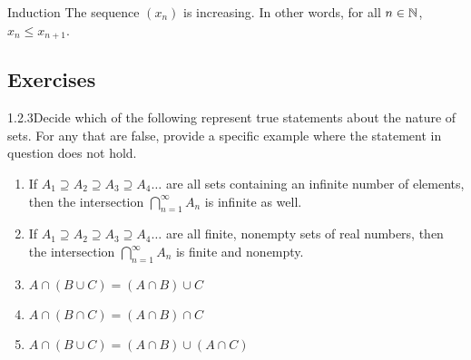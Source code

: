 \begin{example}
    {Induction} The sequence $(x_n)$ is increasing. In other words, for all $n\in \mathbb{N}$, $x_n \leq x_{n+1}$. 
\end{example}


\subsection*{Exercises}

\begin{exercise}
    {1.2.3}Decide which of the following represent true statements about
the nature of sets. For any that are false, provide a specific example where the
statement in question does not hold.
\begin{enumerate}
    \item If $A_1 \supseteq A_2 \supseteq A_3 \supseteq A_4\dots$ are all sets containing an infinite number of
elements, then the intersection $\bigcap^\infty_{n=1} A_n$ is infinite as well.
    \item If $A_1 \supseteq A_2 \supseteq A_3 \supseteq A_4\dots$ are all finite, nonempty sets of real numbers,
then the intersection $\bigcap^\infty_{n=1} A_n$ is finite and nonempty.
    \item $A \cap (B \cup C) = (A \cap B) \cup C$
    \item $A \cap (B \cap C) = (A \cap B) \cap C$
    \item $A \cap (B \cup C) = (A \cap B) \cup (A \cap C)$
\end{enumerate}
\end{exercise}

